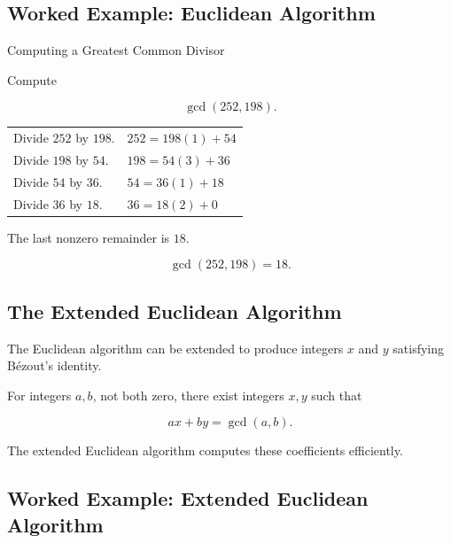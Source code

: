 \subsection{Worked Example: Euclidean Algorithm}
\label{subsec:worked-euclidean-computation}

\begin{workedexamplebox}{Computing a Greatest Common Divisor}

Compute

\[ \gcd(252,198). \]

\begin{tabularx}{\textwidth}{@{}>{\raggedright\arraybackslash}p{}X@{}}
Divide \(252\) by \(198\). & \(252=198(1)+54\)\\
Divide \(198\) by \(54\). & \(198=54(3)+36\)\\
Divide \(54\) by \(36\). & \(54=36(1)+18\)\\
Divide \(36\) by \(18\). & \(36=18(2)+0\)
\end{tabularx}

The last nonzero remainder is \(18\).

\begin{answerbox}
\[ \boxed{\gcd(252,198)=18.} \]
\end{answerbox}
\end{workedexamplebox}

\subsection{The Extended Euclidean Algorithm}
\label{subsec:extended-euclidean-algorithm}

The Euclidean algorithm can be extended to produce integers \(x\) and \(y\)
satisfying Bézout's identity.

\begin{theorem}
For integers \(a,b\), not both zero, there exist integers \(x,y\) such that

\[ \boxed{ax+by=\gcd(a,b).} \]
\end{theorem}

The extended Euclidean algorithm computes these coefficients efficiently.

\subsection{Worked Example: Extended Euclidean Algorithm}
\label{subsec:worked-extended-euclidean}

